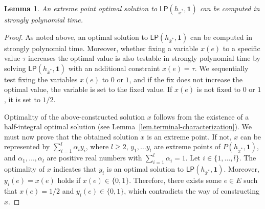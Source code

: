 \documentclass{article}
\newtheorem{lemma}{Lemma}
\newcommand{\allone}{\mathbf{1}}
\newcommand{\cut}{P}
\newcommand{\lp}{\mathsf{LP}}
\begin{document}
\begin{lemma}\label{lem.lp-stronglypoly}
An extreme point optimal solution to $\lp(h_{\bar{x}^*},\allone)$ 
can be computed in strongly polynomial time.
\end{lemma}
 \begin{proof}
  As noted above, 
an optimal solution to $\lp(h_{\bar{x}^*},\allone)$ 
can be computed in strongly polynomial time.
Moreover, 
whether fixing a variable $x(e)$ to a specific value $\tau$
increases the optimal value is also testable in strongly polynomial time 
by solving $\lp(h_{\bar{x}^*},\allone)$ 
with an additional constraint $x(e)=\tau$. 
We sequentially test fixing the variables $x(e)$ to $0$ or $1$,
and if the fix does not increase the optimal value, the variable is set to the fixed value.
If $x(e)$ is not fixed to $0$ or $1$,
it is set to $1/2$.

Optimality of the above-constructed solution $x$ 
follows from the existence of a half-integral optimal
solution (see Lemma~\ref{lem.terminal-characterization}).
We must now prove that the obtained solution $x$ is an extreme point.
If not, $x$ can be represented by
$\sum_{i=1}^l \alpha_i y_i$, where $l \geq 2$,
$y_1,\ldots y_l$ are extreme points of $\cut(h_{\bar{x}^*},\allone)$,
and $\alpha_1,\ldots,\alpha_l$ are positive real numbers with
$\sum_{i=1}^l \alpha_i=1$.
Let $i \in \{1,\ldots,l\}$.
The optimality of $x$ indicates that
$y_i$ is an optimal solution to 
$\lp(h_{\bar{x}^*},\allone)$.
Moreover,  $y_i(e)=x(e)$ holds if $x(e) \in \{0,1\}$.
Therefore, there exists some $e \in E$ such that $x(e)=1/2$ and $y_i(e) \in \{0,1\}$,
which contradicts the way of constructing $x$.
 \end{proof}
\end{document}
